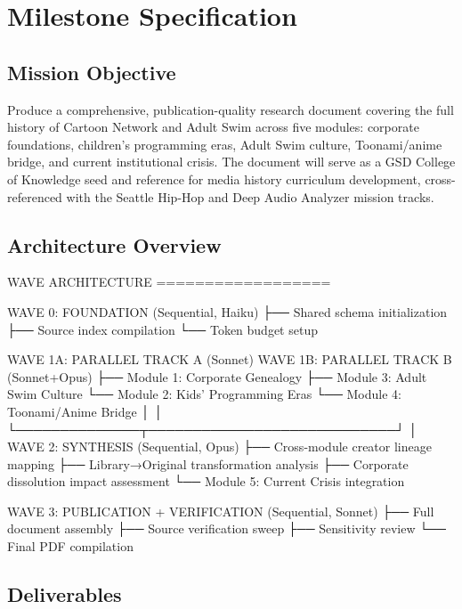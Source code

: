 \documentclass[11pt,letterpaper]{article}
\begin{document}
\section{Milestone Specification}

\subsection{Mission Objective}

Produce a comprehensive, publication-quality research document covering the full history of Cartoon Network and Adult Swim across five modules: corporate foundations, children's programming eras, Adult Swim culture, Toonami/anime bridge, and current institutional crisis. The document will serve as a GSD College of Knowledge seed and reference for media history curriculum development, cross-referenced with the Seattle Hip-Hop and Deep Audio Analyzer mission tracks.

\subsection{Architecture Overview}

\begin{asciibox}
WAVE ARCHITECTURE
==================

  WAVE 0: FOUNDATION (Sequential, Haiku)
  ├── Shared schema initialization
  ├── Source index compilation
  └── Token budget setup

  WAVE 1A: PARALLEL TRACK A (Sonnet)          WAVE 1B: PARALLEL TRACK B (Sonnet+Opus)
  ├── Module 1: Corporate Genealogy            ├── Module 3: Adult Swim Culture
  └── Module 2: Kids' Programming Eras        └── Module 4: Toonami/Anime Bridge
                   │                                           │
                   └──────────────┬────────────────────────────┘
                                  │
  WAVE 2: SYNTHESIS (Sequential, Opus)
  ├── Cross-module creator lineage mapping
  ├── Library→Original transformation analysis
  ├── Corporate dissolution impact assessment
  └── Module 5: Current Crisis integration

  WAVE 3: PUBLICATION + VERIFICATION (Sequential, Sonnet)
  ├── Full document assembly
  ├── Source verification sweep
  ├── Sensitivity review
  └── Final PDF compilation
\end{asciibox}

\subsection{Deliverables}
\end{document}

